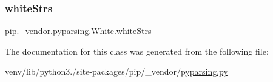 \subsubsection{\texorpdfstring{white\+Strs}{whiteStrs}}
{\footnotesize\ttfamily pip.\+\_\+vendor.\+pyparsing.\+White.\+white\+Strs\hspace{0.3cm}{\ttfamily [static]}}



The documentation for this class was generated from the following file\+:\begin{DoxyCompactItemize}
\item 
venv/lib/python3./site-\/packages/pip/\+\_\+vendor/\hyperlink{pip_2__vendor_2pyparsing_8py}{pyparsing.\+py}\end{DoxyCompactItemize}
